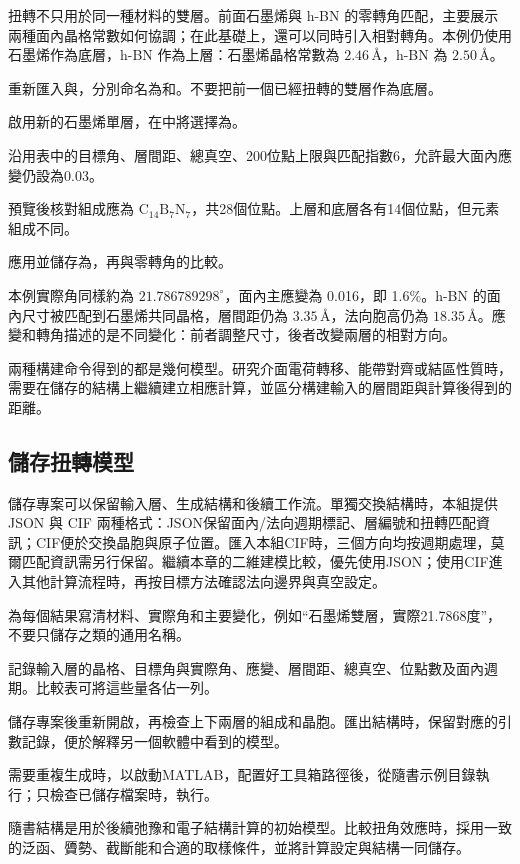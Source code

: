 扭轉不只用於同一種材料的雙層。前面石墨烯與 h-BN 的零轉角匹配，主要展示兩種面內晶格常數如何協調；在此基礎上，還可以同時引入相對轉角。本例仍使用石墨烯作為底層，h-BN 作為上層：石墨烯晶格常數為 $2.46\,\text{\AA}$，h-BN 為 $2.50\,\text{\AA}$。

\begin{steps}
  \item 重新匯入與，分別命名為和。不要把前一個已經扭轉的雙層作為底層。
  \item 啟用新的石墨烯單層，在中將選擇為。
  \item 沿用表中的目標角、層間距、總真空、200位點上限與匹配指數6，允許最大面內應變仍設為0.03。
  \item 預覽後核對組成應為 $\mathrm{C_{14}B_7N_7}$，共28個位點。上層和底層各有14個位點，但元素組成不同。
  \item 應用並儲存為，再與零轉角的比較。
\end{steps}

本例實際角同樣約為 $21.786789298^\circ$，面內主應變為 0.016，即 1.6\%。h-BN 的面內尺寸被匹配到石墨烯共同晶格，層間距仍為 $3.35\,\text{\AA}$，法向胞高仍為 $18.35\,\text{\AA}$。應變和轉角描述的是不同變化：前者調整尺寸，後者改變兩層的相對方向。

兩種構建命令得到的都是幾何模型。研究介面電荷轉移、能帶對齊或結區性質時，需要在儲存的結構上繼續建立相應計算，並區分構建輸入的層間距與計算後得到的距離。

\subsection{儲存扭轉模型}

儲存專案可以保留輸入層、生成結構和後續工作流。單獨交換結構時，本組提供 JSON 與 CIF 兩種格式：JSON保留面內/法向週期標記、層編號和扭轉匹配資訊；CIF便於交換晶胞與原子位置。匯入本組CIF時，三個方向均按週期處理，莫爾匹配資訊需另行保留。繼續本章的二維建模比較，優先使用JSON；使用CIF進入其他計算流程時，再按目標方法確認法向邊界與真空設定。

\begin{steps}
  \item 為每個結果寫清材料、實際角和主要變化，例如“石墨烯雙層，實際21.7868度”，不要只儲存之類的通用名稱。
  \item 記錄輸入層的晶格、目標角與實際角、應變、層間距、總真空、位點數及面內週期。比較表可將這些量各佔一列。
  \item 儲存專案後重新開啟，再檢查上下兩層的組成和晶胞。匯出結構時，保留對應的引數記錄，便於解釋另一個軟體中看到的模型。
  \item 需要重複生成時，以啟動MATLAB\regmark{}，配置好工具箱路徑後，從隨書示例目錄執行；只檢查已儲存檔案時，執行。
\end{steps}

隨書結構是用於後續弛豫和電子結構計算的初始模型。比較扭角效應時，採用一致的泛函、贗勢、截斷能和合適的取樣條件，並將計算設定與結構一同儲存。
